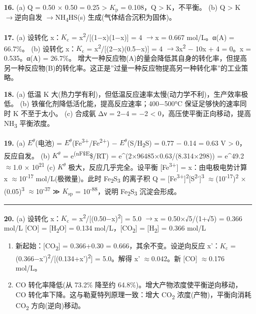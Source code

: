 \documentclass[a4paper,11pt]{ctexart}
\newcommand{\箭}{\ensuremath{\rightarrow}}
\newcommand{\左箭}{\ensuremath{\leftarrow}}
\newcommand{\上箭}{\ensuremath{\uparrow}}
\newcommand{\下箭}{\ensuremath{\downarrow}}
\newcommand{\衡}{\ensuremath{\rightleftharpoons}}
\newcommand{\双箭}{\ensuremath{\leftrightarrow}}
\newcommand{\约等于}{\ensuremath{\approx}}
\newcommand{\小于等于}{\ensuremath{\leq}}
\newcommand{\大于等于}{\ensuremath{\geq}}
\newcommand{\不等于}{\ensuremath{\neq}}
\newcommand{\西格马}{\ensuremath{\sigma}}
\newcommand{\派}{\ensuremath{\pi}}
\begin{document}
\textbf{16.}
(a) Q = 0.50 × 0.50 = 0.25 \textgreater{} \(K_{\mathrm p}\) = 0.108，Q \textgreater{} K，不平衡。
(b) Q \textgreater{} K \箭 逆向自发 \箭 NH\textsubscript{4}HS(s) 生成(气体结合沉积为固体)。

\textbf{17.}
(a) 设转化 x：\(K_{\mathrm c}\) = x\textsuperscript{2}/{[}(1−x)(1−x){]} = 4 \箭 x = 0.667 mol/L。α(A) = 66.7\%。
(b) 设转化 x：\(K_{\mathrm c}\) = x\textsuperscript{2}/{[}(2−x)(0.5−x){]} = 4 \箭 3x\textsuperscript{2} − 10x + 4 = 0。x = 0.535。α(A) = 26.7\%。
增大一种反应物(A)的量会降低其自身的转化率，但提高另一种反应物(B)的转化率。这正是''过量一种反应物提高另一种转化率''的工业策略。

\textbf{18.}
(a) 低温 K 大(热力学有利)，但低温反应速率太慢(动力学不利)，生产效率极低。
(b) 铁催化剂降低活化能，提高反应速率；400−500°C 保证足够快的速率同时 K 不至于太小。
(c) 合成氨 Δν = 2−4 = −2 \textless{} 0，高压使平衡正向移动，提高 NH\textsubscript{3} 平衡浓度。

\textbf{19.}
(a) \(E^\theta\)(电池) = \(E^\theta\)(Fe\textsuperscript{3+}/Fe\textsuperscript{2+}) − \(E^\theta\)(S/H\textsubscript{2}S) = 0.77 − 0.14 = 0.63 V \textgreater{} 0，反应自发。
(b) \(K^\theta\) = e\textsuperscript{(nF\$E}\theta\$/RT) = e\^{}(2×96485×0.63/(8.314×298)) = e\^{}49.2 \约等于 1.0 × 10\textsuperscript{21}
(c) \(K^\theta\) 极大，反应几乎完全。设平衡 {[}Fe\textsuperscript{3+}{]} = x：由电极电势计算 x \约等于 10\textsuperscript{-17} mol/L(极微量)。此时 Fe\textsubscript{2}S\textsubscript{3} 的离子积 Q = {[}Fe\textsuperscript{3+}{]}\textsuperscript{2}{[}S\textsuperscript{2-}{]}\textsuperscript{3} \约等于 (10\textsuperscript{-17})\textsuperscript{2} × (0.05)\textsuperscript{3} \约等于 10\textsuperscript{-37} ≫ \(K_{\mathrm{sp}}\) = 10\textsuperscript{-88}，说明 Fe\textsubscript{2}S\textsubscript{3} 沉淀会形成。

\begin{center}\rule{0.5\linewidth}{0.5pt}\end{center}

\textbf{20.}
(a) 设转化 x：\(K_{\mathrm c}\) = x\textsuperscript{2}/{[}(0.50−x)\textsuperscript{2}{]} = 5.0 \箭 x = 0.50×√5/(1+√5) = 0.366 mol/L
{[}CO{]} = {[}H\textsubscript{2}O{]} = 0.134 mol/L，{[}CO\textsubscript{2}{]} = {[}H\textsubscript{2}{]} = 0.366 mol/L

\begin{enumerate}
\def\labelenumi{(\alph{enumi})}
\setcounter{enumi}{1}
\item
  新起始：{[}CO\textsubscript{2}{]} = 0.366+0.30 = 0.666，其余不变。设逆向反应 x'：\(K_{\mathrm c}\) = (0.366−x')\textsuperscript{2}/{[}(0.134+x')\textsuperscript{2}{]} = 5.0。解得 x' \约等于 0.042。新 {[}CO{]} \约等于 0.176 mol/L。
\item
  CO 转化率降低(从 73.2\% 降至约 64.8\%)。增大产物浓度使平衡逆向移动，CO 转化率下降。这与勒夏特列原理一致：增大 CO\textsubscript{2} 浓度(产物)，平衡向消耗 CO\textsubscript{2} 方向(逆向)移动。
\end{enumerate}
\end{document}
